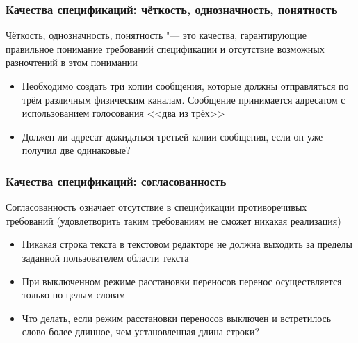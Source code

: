 \documentclass{softengineering-lectures}
\begin{document}
\begin{frame} \frametitle{Качества спецификаций: чёткость, однозначность,
    понятность}

  \begin{definition}
    \alert{ Чёткость, однозначность, понятность} "--- это качества,
    гарантирующие правильное понимание требований спецификации и отсутствие
    возможных разночтений в этом понимании
  \end{definition}
  
  \begin{itemize}
  \item Необходимо создать три копии сообщения, которые должны отправляться по
    трём различным физическим каналам. Сообщение принимается адресатом с
    использованием голосования <<два из трёх>>
  \item \alert{ Должен ли адресат дожидаться третьей копии сообщения, если он
      уже получил две одинаковые? }
  \end{itemize}
  
\end{frame} 

\begin{frame} \frametitle{Качества спецификаций: согласованность}

  \begin{definition}
    \alert{Согласованность} означает отсутствие в спецификации противоречивых
    требований (удовлетворить таким требованиям не сможет никакая реализация)
  \end{definition}
  
  \begin{itemize}
  \item Никакая строка текста в текстовом редакторе не должна выходить за
    пределы заданной пользователем области текста
  \item При выключенном режиме расстановки переносов перенос осуществляется
    только по целым словам
  \item \alert{ Что делать, если режим расстановки переносов выключен и
      встретилось слово более длинное, чем установленная длина строки? }
  \end{itemize}    

\end{frame}
\end{document}

